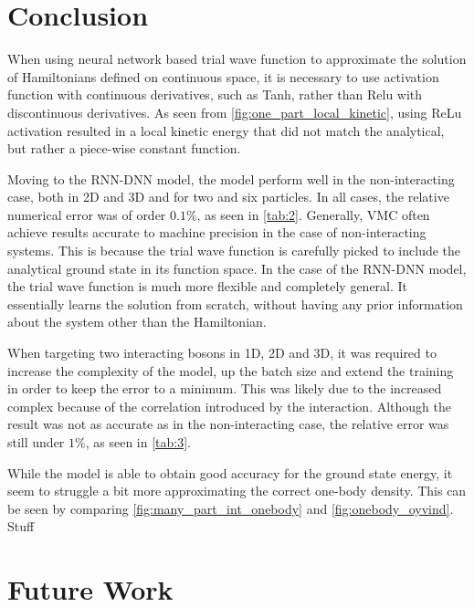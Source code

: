 \begin{minipage}{\columnwidth}
\section{Conclusion}\label{sec:Conclusion}
When using neural network based trial wave function to approximate the solution of Hamiltonians defined on continuous space, it is necessary to use activation function with continuous derivatives, such as Tanh, rather than Relu with discontinuous derivatives. As seen from \autoref{fig:one_part_local_kinetic}, using ReLu activation resulted in a local kinetic energy that did not match the analytical, but rather a piece-wise constant function.

Moving to the RNN-DNN model, the model perform well in the non-interacting case, both in 2D and 3D and for two and six particles. In all cases, the relative numerical error was of order $0.1\%$, as seen in \autoref{tab:2}. Generally, VMC often achieve results accurate to machine precision in the case of non-interacting systems. This is because the trial wave function is carefully picked to include the analytical ground state in its function space. In the case of the RNN-DNN model, the trial wave function is much more flexible and completely general. It essentially learns the solution from scratch, without having any prior information about the system other than the Hamiltonian.

When targeting two interacting bosons in 1D, 2D and 3D, it was required to increase the complexity of the model, up the batch size and extend the training in order to keep the error to a minimum. This was likely due to the increased complex because of the correlation introduced by the interaction. Although the result was not as accurate as in the non-interacting case, the relative error was still under $1\%$, as seen in \autoref{tab:3}.

While the model is able to obtain good accuracy for the ground state energy, it seem to struggle a bit more approximating the correct one-body density. This can be seen by comparing \autoref{fig:many_part_int_onebody} and \autoref{fig:onebody_oyvind}. Stuff

\end{minipage}

\section{Future Work}
  
